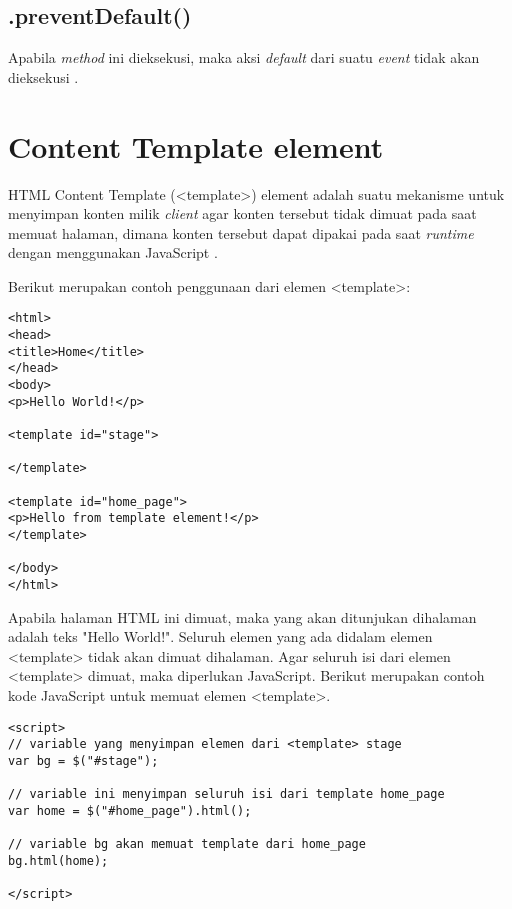 \subsection{.preventDefault()}
Apabila \textit{method} ini dieksekusi, maka aksi \textit{default} dari suatu \textit{event} tidak akan dieksekusi \cite{mit:06:jQueryAPI}.

\section{Content Template element}
\label{sec:template}

HTML Content Template (<template>) element adalah suatu mekanisme untuk menyimpan konten milik \textit{client} agar konten tersebut tidak dimuat pada saat memuat halaman, dimana konten tersebut dapat dipakai pada saat \textit{runtime} dengan menggunakan JavaScript \cite{moz:05:template}. 

Berikut merupakan contoh penggunaan dari elemen <template>:

\begin{lstlisting}
<html>
<head>
<title>Home</title>
</head>
<body>
<p>Hello World!</p>

<template id="stage">

</template>

<template id="home_page">
<p>Hello from template element!</p>
</template>

</body>
</html>
\end{lstlisting}

Apabila halaman HTML ini dimuat, maka yang akan ditunjukan dihalaman adalah teks "Hello World!". Seluruh elemen yang ada didalam elemen <template> tidak akan dimuat dihalaman. Agar seluruh isi dari elemen <template> dimuat, maka diperlukan JavaScript. Berikut merupakan contoh kode JavaScript untuk memuat elemen <template>.

\begin{lstlisting}
<script>
// variable yang menyimpan elemen dari <template> stage
var bg = $("#stage");

// variable ini menyimpan seluruh isi dari template home_page
var home = $("#home_page").html();

// variable bg akan memuat template dari home_page
bg.html(home);

</script>
\end{lstlisting}

